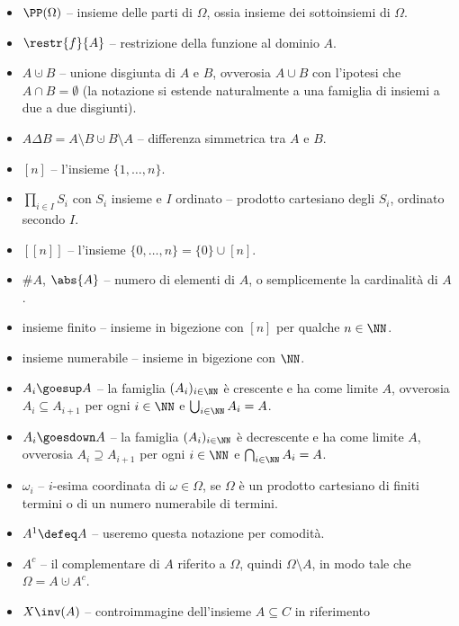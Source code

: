 \begin{multicols*}{2}
    \begin{itemize}
        \item $\PP(\Omega)$ -- insieme delle parti di $\Omega$, ossia insieme
        dei sottoinsiemi di $\Omega$.
        \item $\restr{f}{A}$ -- restrizione della funzione al dominio $A$.
        \item $A \cupdot B$ -- unione disgiunta di $A$ e $B$, ovverosia $A \cup B$ con
        l'ipotesi che $A \cap B = \emptyset$ (la notazione si estende naturalmente a
        una famiglia di insiemi a due a due disgiunti).
        \item $A \Delta B = A \setminus B \cupdot B \setminus A$ -- differenza simmetrica
        tra $A$ e $B$.
        \item $[n]$ -- l'insieme $\{1, \ldots, n\}$.
        \item $\prod_{i \in I} S_i$ con $S_i$ insieme e $I$ ordinato -- prodotto cartesiano degli $S_i$, ordinato secondo $I$.
        \item $[[n]]$ -- l'insieme $\{0, \ldots, n\} = \{0\} \cup [n]$. 
        \item $\#A$, $\abs{A}$ -- numero di elementi di $A$, o semplicemente la cardinalità di $A$.
        \item insieme finito -- insieme in bigezione con $[n]$ per qualche $n \in \NN$.
        \item insieme numerabile -- insieme in bigezione con $\NN$.
        \item $A_i \goesup A$ -- la famiglia $(A_i)_{i \in \NN}$ è crescente e ha
        come limite $A$, ovverosia $A_i \subseteq A_{i+1}$ per ogni $i \in \NN$ e
        $\bigcup_{i \in \NN} A_i = A$.
        \item $A_i \goesdown A$ -- la famiglia $(A_i)_{i \in \NN}$ è decrescente e ha
        come limite $A$, ovverosia $A_i \supseteq A_{i+1}$ per ogni $i \in \NN$ e
        $\bigcap_{i \in \NN} A_i = A$.
        \item $\omega_i$ -- $i$-esima coordinata di $\omega \in \Omega$, se
        $\Omega$ è un prodotto cartesiano di finiti termini o di un numero
        numerabile di termini.
        \item $A^1 \defeq A$ -- useremo questa notazione per comodità.
        \item $A^c$ -- il complementare di $A$ riferito a $\Omega$, quindi $\Omega \setminus A$, in modo tale che $\Omega = A \cupdot A^c$.
        \item $X\inv(A)$ -- controimmagine dell'insieme $A \subseteq C$ in riferimento

\end{itemize}
\end{multicols*}
